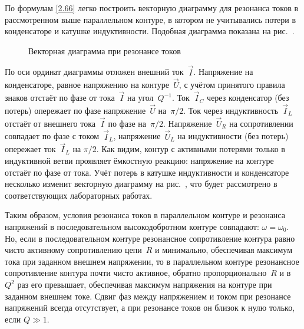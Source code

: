 По формулам \eqref{2.66} легко построить векторную диаграмму 
для резонанса токов в рассмотренном выше параллельном контуре, в котором 
не учитывались потери в конденсаторе и катушке индуктивности. 
Подобная диаграмма показана на рис.~.

\begin{figure}[h!]
	\centering
	\caption{Векторная диаграмма при резонансе токов}
\end{figure}

По оси ординат диаграммы отложен внешний ток~$\vec I$. Напряжение на конденсаторе, равное
напряжению на контуре~$\vec U$, с учётом принятого правила знаков отстаёт по
фазе от тока~$\vec I$ на угол~$Q^{-1}$. Ток~$\vec I_C$ через конденсатор (без
потерь) опережает по фазе напряжение~$\vec U$ на~$\pi/2$. Ток через
индуктивность~$\vec I_L$ отстаёт от внешнего тока~$\vec I$ по фазе на~$\pi/2$.
Напряжение~$\vec U_R$ на сопротивлении совпадает по фазе с током~$\vec I_L$,
напряжение~$\vec U_L$ на индуктивности (без потерь) опережает ток~$\vec I_L$ на
$\pi/2$. Как видим, контур с активными потерями только в индуктивной ветви
проявляет ёмкостную реакцию: напряжение на контуре отстаёт по фазе от тока. Учёт
потерь в катушке индуктивности и конденсаторе несколько изменит векторную
диаграмму на рис.~, что будет рассмотрено в соответствующих
лабораторных работах.

Таким образом, условия резонанса токов в параллельном контуре и резонанса
напряжений в последовательном высокодобротном контуре совпадают:
$\omega=\omega_0$. Но, если в последовательном контуре резонансное сопротивление
контура равно чисто активному сопротивлению цепи~$R$ и минимально, обеспечивая
максимум тока при заданном внешнем напряжении, то в параллельном контуре
резонансное сопротивление контура почти чисто активное, обратно
пропорционально~$R$ и в~$Q^2$ раз его превышает, обеспечивая максимум напряжения
на контуре при заданном внешнем токе. Сдвиг фаз между напряжением и током при
резонансе напряжений всегда отсутствует, а при резонансе токов он близок к нулю
только, если $Q\gg1$.


\label{sec:ust}


